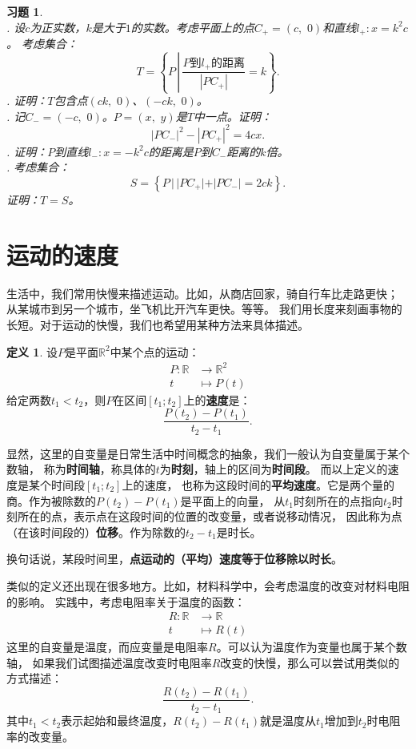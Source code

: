 \documentclass[12pt,UTF8]{ctexbook}
\theoremstyle{definition}
\newtheorem{df}{定义}[section]
\theoremstyle{plain}
\newtheorem{xt}{习题}[section]
\begin{document}
\begin{xt}
    \mbox{} \\
    . 设$c$为正实数，$k$是大于$1$的实数。考虑平面上的点$C_+ = (c,\,\, 0)$和直线$l_+ : x = k^2c$。
    考虑集合：
    $$T = \left\{P\,\left| \, \frac{P\mbox{到}l_+\mbox{的距离}}{|PC_+|} = k\right.\right\}.$$
    . 证明：$T$包含点$(ck, \,\,0)$、$(-ck,\,\,0)$。\\
    . 记$C_- = (-c,\,\,0)$。$P = (x,\,\, y)$是$T$中一点。证明：
    $$ |PC_-|^2 - |PC_+|^2 = 4cx.$$
    . 证明：$P$到直线$l_-: x = -k^2c$的距离是$P$到$C_-$距离的$k$倍。\\
    . 考虑集合：
    $$ S = \left\{P\,| \, |PC_+| + |PC_-| = 2ck\right\}.$$
    证明：$T = S$。
\end{xt}

\section{运动的速度}
生活中，我们常用快慢来描述运动。比如，从商店回家，骑自行车比走路更快；
从某城市到另一个城市，坐飞机比开汽车更快。等等。
我们用长度来刻画事物的长短。对于运动的快慢，我们也希望用某种方法来具体描述。

\begin{df}
    设$P$是平面$\mathbb{R}^2$中某个点的运动：
    \begin{align*}
        P: \mathbb{R} &\rightarrow \mathbb{R}^2  \\
             t \, &\mapsto P(t) 
    \end{align*}
    给定两数$t_1 < t_2$，则$P$在区间$[t_1;t_2]$上的\textbf{速度}是：
    $$ \frac{P(t_2) - P(t_1)}{t_2 - t_1}.$$
\end{df}
显然，这里的自变量是日常生活中时间概念的抽象，我们一般认为自变量属于某个数轴，
称为\textbf{时间轴}，称具体的$t$为\textbf{时刻}，轴上的区间为\textbf{时间段}。
而以上定义的速度是某个时间段$[t_1;t_2]$上的速度，
也称为这段时间的\textbf{平均速度}。它是两个量的商。作为被除数的$P(t_2) - P(t_1)$是平面上的向量，
从$t_1$时刻所在的点指向$t_2$时刻所在的点，表示点在这段时间的位置的改变量，或者说移动情况，
因此称为点（在该时间段的）\textbf{位移}。作为除数的$t_2 - t_1$是时长。

换句话说，某段时间里，\textbf{点运动的（平均）速度等于位移除以时长}。

类似的定义还出现在很多地方。比如，材料科学中，会考虑温度的改变对材料电阻的影响。
实践中，考虑电阻率关于温度的函数：
\begin{align*}
    R: \mathbb{R} &\rightarrow \mathbb{R}  \\
         t \, &\mapsto R(t) 
\end{align*}
这里的自变量是温度，而应变量是电阻率$R$。可以认为温度作为变量也属于某个数轴，
如果我们试图描述温度改变时电阻率$R$改变的快慢，那么可以尝试用类似的方式描述：
$$ \frac{R(t_2) - R(t_1)}{t_2 - t_1}.$$
其中$t_1 < t_2$表示起始和最终温度，$R(t_2) - R(t_1)$就是温度从$t_1$增加到$t_2$时电阻率的改变量。
\end{document}
